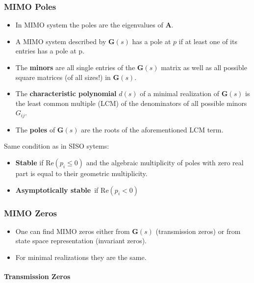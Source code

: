 \subsubsection{MIMO Poles}
\begin{itemize}
    \item In MIMO system the poles are the eigenvalues of $\mathbf{A}$.
    \item A MIMO system described by $\mathbf{G}(s)$ has a pole at $p$ if at least one of its entries has a pole at p.
    \item The \textbf{minors} are all single entries of the $\mathbf{G}(s)$ matrix as well as all possible square matrices (of all sizes!) in $\mathbf{G}(s)$.
    \item The \textbf{characteristic polynomial} $d(s)$ of a minimal realization of $\mathbf{G}(s)$ is the least common multiple (LCM) of the denominators of all possible minors $G_{ij}$.
    \item The \textbf{poles} of $\mathbf{G}(s)$ are the roots of the aforementioned LCM term.
\end{itemize}



Same condition as in SISO sytems:
\begin{itemize}
    \item \textbf{Stable} if $\mathrm{Re}(p_i \le 0)$ and the algebraic multiplicity of poles with zero real part is equal to their geometric multiplicity.
    \item \textbf{Asymptotically stable}\ if $\mathrm{Re}(p_i<0)$
\end{itemize}


\subsubsection{MIMO Zeros}
\begin{itemize}
    \item One can find MIMO zeros either from $\mathbf{G}(s)$ (transmission zeros) or from state space representation (invariant zeros).
    \item For minimal realizations they are the same.
\end{itemize}

\paragraph{Transmission Zeros}

